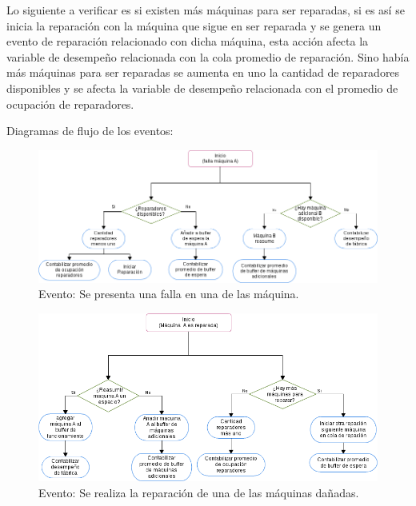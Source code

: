 \documentclass[12pt]{article}
\begin{document}
\begin{enumerate}
Lo siguiente a verificar es si existen m\'as m\'aquinas para ser reparadas, si es así se inicia la reparaci\'on con la m\'aquina que sigue en ser reparada y se genera un evento de reparaci\'on relacionado con dicha m\'aquina, esta acci\'on afecta la variable de desempeño relacionada con la cola promedio de reparaci\'on. Sino hab\'ia m\'as m\'aquinas para ser reparadas se aumenta en uno la cantidad de reparadores disponibles y se afecta la variable de desempeño relacionada con el promedio de ocupación de reparadores.

\end{enumerate}


Diagramas de flujo de los eventos:

\newpage 

\begin{figure}
  \centering
  	\includegraphics[scale=0.5]{EventoFallo.png} 
  \caption{Evento: Se presenta una falla en una de las máquina.}
  \label{fig:eventofallo}
\end{figure}

\begin{figure}
  \centering
  	\includegraphics[scale=0.5]{EventoReparacion.png} 
  \caption{Evento: Se realiza la reparación de una de las máquinas dañadas.}
  \label{fig:eventoreparacion}
\end{figure}
\end{document}
